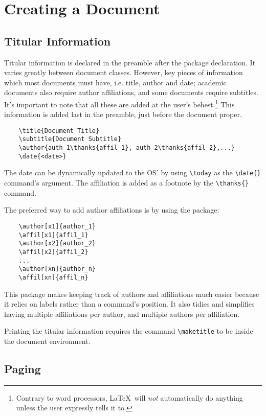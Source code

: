\chapter{Creating a Document}
\section{Titular Information}
%

Titular information is declared in the preamble after the package
declaration.  It varies greatly between document classes.  However,
key pieces of information which most documents must have, i.e. title,
author and date; academic documents also require author affiliations,
and some documents require subtitles.  It's important to note that all
these are added at the user's behest.\footnote{Contrary to word
  processors, \LaTeX~will \emph{not} automatically do anything unless
  the user expressly tells it to.} This information is added last in
the preamble, just before the document proper.
\begin{verbatim}
	\title{Document Title}
	\subtitle{Document Subtitle}
	\author{auth_1\thanks{affil_1}, auth_2\thanks{affil_2},...}
	\date{<date>}
\end{verbatim}
The date can be dynamically updated to the OS' by using \verb|\today|
as the \verb|\date{}| command's argument.  The affiliation is added as
a footnote by the \verb|\thanks{}| command.

The preferred way to add author affiliations is by using the
 package:
\begin{verbatim}
	\author[x1]{author_1}
	\affil[x1]{affil_1}
	\author[x2]{author_2}
	\affil[x2]{affil_2}
	...
	\author[xn]{author_n}
	\affil[xn]{affil_n}
\end{verbatim}
This package makes keeping track of authors and affiliations much
easier because it relies on labels rather than a command's position.
It also tidies and simplifies having multiple affiliations per author,
and multiple authors per affiliation.

Printing the titular information requires the command
\verb|\maketitle| to be inside the document environment.

%
\section{Paging}
%

